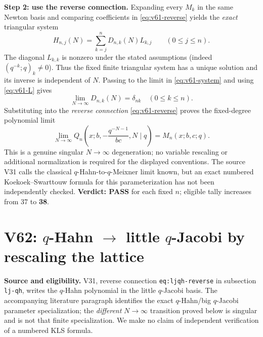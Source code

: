 \documentclass[11pt]{article}
\begin{document}
\noindent\textbf{Step 2: use the reverse connection.} Expanding every $M_k$ in the same Newton basis and comparing coefficients in \eqref{eq:v61-reverse} yields the \emph{exact} triangular system
\begin{equation}\label{eq:v61-system}
 H_{n,j}(N)=\sum_{k=j}^n D_{n,k}(N)L_{k,j}\qquad(0\le j\le n).
\end{equation}
The diagonal $L_{k,k}$ is nonzero under the stated assumptions (indeed $(q^{-k};q)_k\ne0$). Thus the fixed finite triangular system has a unique solution and its inverse is independent of $N$. Passing to the limit in \eqref{eq:v61-system} and using \eqref{eq:v61-L} gives
\begin{equation}\label{eq:v61-delta}
 \boxed{\displaystyle\lim_{N\to\infty}D_{n,k}(N)=\delta_{nk}\quad(0\le k\le n).}
\end{equation}
Substituting into the \emph{reverse connection} \eqref{eq:v61-reverse} proves the fixed-degree polynomial limit
\begin{equation}\label{eq:v61-limit}
 \boxed{\displaystyle\lim_{N\to\infty}
 Q_n\left(x;b,-\frac{q^{-N-1}}{bc},N\mid q\right)=M_n(x;b,c;q).}
\end{equation}
This is a genuine singular $N\to\infty$ degeneration; no variable rescaling or additional normalization is required for the displayed conventions. The source V31 calls the classical $q$-Hahn-to-$q$-Meixner limit known, but an exact numbered Koekoek--Swarttouw formula for this parameterization has not been independently checked. \textbf{Verdict: PASS} for each fixed $n$; eligible tally increases from 37 to \textbf{38}.


\section{V62: $q$-Hahn $\longrightarrow$ little $q$-Jacobi by rescaling the lattice}
\noindent\textbf{Source and eligibility.} V31, reverse connection
\texttt{eq:ljqh-reverse} in subsection \texttt{lj-qh}, writes the $q$-Hahn
polynomial in the little $q$-Jacobi basis. The accompanying literature
paragraph identifies the exact $q$-Hahn/big $q$-Jacobi parameter
specialization; the \emph{different} $N\to\infty$ transition proved below
is singular and is not that finite specialization. We make no claim of
independent verification of a numbered KLS formula.
\end{document}
